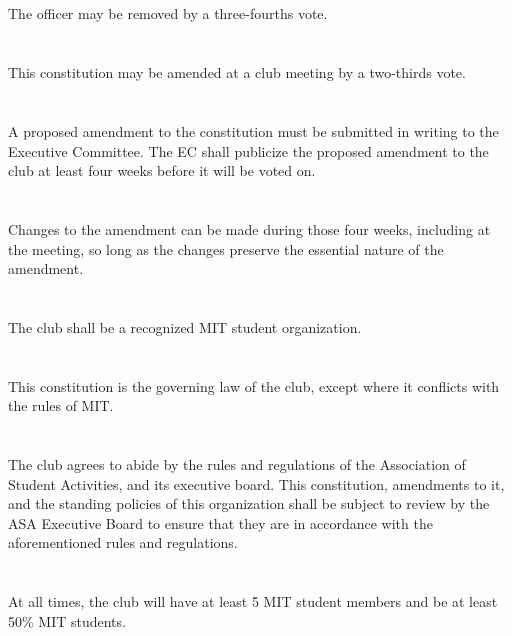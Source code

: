 \documentclass{bylaws}
\begin{document}
\subsection{}The officer may be removed by a three-fourths vote.


\section{}This constitution may be amended at a club meeting by a two-thirds vote.
\section{}A proposed amendment to the constitution must be submitted in writing to the Executive Committee. The EC shall publicize the proposed amendment to the club at least four weeks before it will be voted on.
\section{}Changes to the amendment can be made during those four weeks, including at the meeting, so long as the changes preserve the essential nature of the amendment.


\section{}The club shall be a recognized MIT student organization.
\section{}This constitution is the governing law of the club, except where it
conflicts with the rules of MIT.
\section{}The club agrees to abide by the rules and regulations of the
Association of Student Activities, and its executive board. This
constitution, amendments to it, and the standing policies of this organization
shall be subject to review by the ASA Executive Board to ensure that
they are in accordance with the aforementioned rules and regulations.
\section{}At all times, the club will have at least 5 MIT student members and be at least 50\% MIT students.
\end{document}
